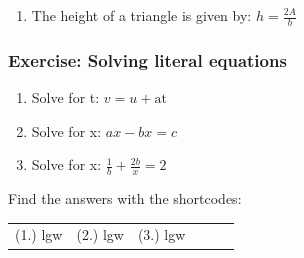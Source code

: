 {\begin{mdframed}[linewidth=4, leftmargin=40, rightmargin=40]
\begin{exercise}
\begin{enumerate}[noitemsep, label=\textbf{Step} \textbf{\arabic*}. ]
{\begin{equation}
      \end{equation}
    }{%
    \setlength{\mymathboxwidth}{\columnwidth}
      \addtolength{\mymathboxwidth}{-48pt}
    \par\vspace{12pt}\noindent\begin{minipage}{\columnwidth}
    \parbox[t]{\mymathboxwidth}{\large$
    A=\frac{1}{2}bÃ---h2A=bÃ---h\left(\mathrm{multiply\; both\; sides\; by\; 2}\right)\frac{2A}{b}=h\left(\mathrm{divide\; both\; sides\; by\; b}\right)$}\hfill
    \parbox[t]{48pt}{\raggedleft 
    (9.83)}
    \end{minipage}\vspace{12pt}\par
    }%
        \item  
        \label{m39258*id1625465489}The height of a triangle is given by: $h=\frac{2A}{b}$
 \par 
        \end{enumerate}
    \end{exercise}
    \end{mdframed}
    }
    \noindent
\label{m39258*id978342}
            \subsubsection{Exercise: Solving literal equations}
            \nopagebreak
\label{m39258*id9734}\begin{enumerate}[noitemsep, label=\textbf{\arabic*}. ] 
            \item Solve for t:
$v=u+\mathrm{at}$\newline
\item Solve for x:
$ax-bx=c$\newline
\item  Solve for x:
$\frac{1}{b}+\frac{2b}{x}=2$
\newline
\end{enumerate}
\label{m39258**end}
\par {} Find the answers with the shortcodes:
 \par \begin{tabular}[h]{cccccc}
 (1.) lgw  &  (2.) lgw  &  (3.) lgw  & \end{tabular}
\label{m39254*secfhsst!!!underscore!!!id4515}
